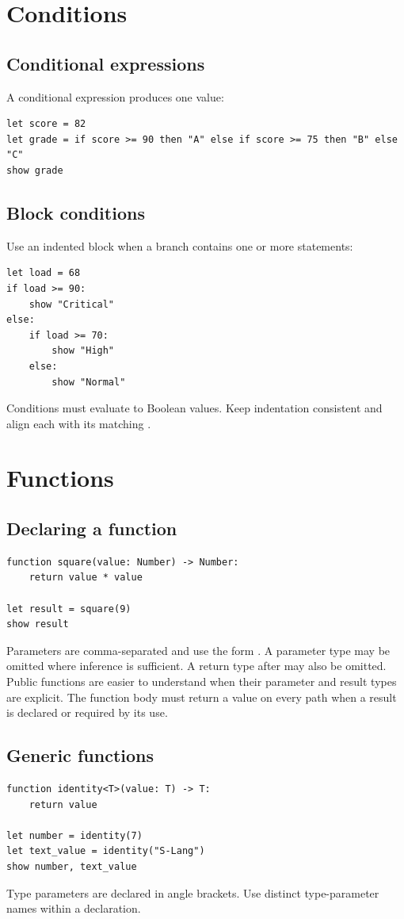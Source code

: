 \documentclass[11pt,a4paper,oneside]{book}
\newcommand{\code}[1]{\texttt{\detokenize{#1}}}
\begin{document}
\chapter{Conditions}
\section{Conditional expressions}
A conditional expression produces one value:
\begin{lstlisting}
let score = 82
let grade = if score >= 90 then "A" else if score >= 75 then "B" else "C"
show grade
\end{lstlisting}

\section{Block conditions}
Use an indented block when a branch contains one or more statements:
\begin{lstlisting}
let load = 68
if load >= 90:
    show "Critical"
else:
    if load >= 70:
        show "High"
    else:
        show "Normal"
\end{lstlisting}
Conditions must evaluate to Boolean values. Keep indentation consistent and align each \code{else:} with its matching \code{if:}.

\chapter{Functions}
\section{Declaring a function}
\begin{lstlisting}
function square(value: Number) -> Number:
    return value * value

let result = square(9)
show result
\end{lstlisting}
Parameters are comma-separated and use the form \code{name: Type}. A parameter type may be omitted where inference is sufficient. A return type after \code{->} may also be omitted. Public functions are easier to understand when their parameter and result types are explicit. The function body must return a value on every path when a result is declared or required by its use.

\section{Generic functions}
\begin{lstlisting}
function identity<T>(value: T) -> T:
    return value

let number = identity(7)
let text_value = identity("S-Lang")
show number, text_value
\end{lstlisting}
Type parameters are declared in angle brackets. Use distinct type-parameter names within a declaration.
\end{document}
